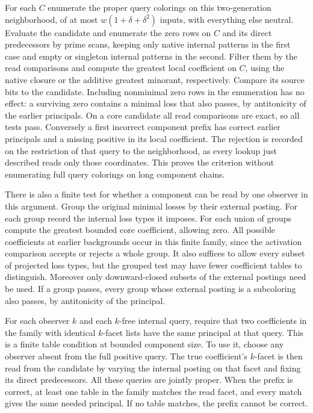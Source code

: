 For each $C$ enumerate the proper query colorings
on this two-generation neighborhood, of at most
$w(1+\delta+\delta^2)$ inputs, with everything
else neutral. Evaluate the candidate and enumerate
the zero rows on $C$ and its direct predecessors
by prime scans, keeping only native internal
patterns in the first case and empty or singleton
internal patterns in the second. Filter them by
the read comparisons and compute the greatest
local coefficient on $C$, using the native closure
or the additive greatest minorant, respectively.
Compare its source bits to the candidate. Including
nonminimal zero rows in the enumeration has no
effect: a surviving zero contains a minimal loss
that also passes, by antitonicity of the earlier
principals. On a core candidate all read comparisons
are exact, so all tests pass. Conversely a first
incorrect component prefix has correct earlier
principals and a missing positive in its local
coefficient. The rejection is recorded on the
restriction of that query to the neighborhood,
as every lookup just described reads only those
coordinates. This proves the criterion without
enumerating full query colorings on long component
chains.

There is also a finite test for whether a component
can be read by one observer in this argument.
Group the original minimal losses by their external
posting. For each group record the internal loss
types it imposes. For each union of groups compute
the greatest bounded core coefficient, allowing
zero. All possible coefficients at earlier
backgrounds occur in this finite family, since
the activation comparison accepts or rejects a
whole group. It also suffices to allow every subset
of projected loss types, but the grouped test
may have fewer coefficient tables to distinguish.
Moreover only downward-closed subsets of the
external postings need be used. If a group passes,
every group whose external posting is a subcoloring
also passes, by antitonicity of the principal.

For each observer $k$ and each $k$-free internal
query, require that two coefficients in the family
with identical $k$-facet lists have the same
principal at that query. This is a finite table
condition at bounded component size. To use it,
choose any observer absent from the full positive
query. The true coefficient's $k$-facet is then
read from the candidate by varying the internal
posting on that facet and fixing its direct
predecessors. All these queries are jointly proper.
When the prefix is correct, at least one table in
the family matches the read facet, and every match
gives the same needed principal. If no table matches,
the prefix cannot be correct.

